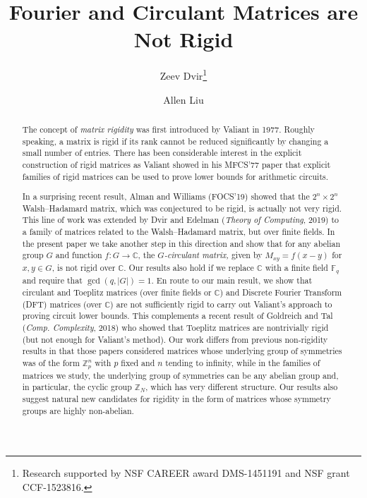 \documentclass{toc}
\newcommand\F{{\mathbb{F}}}
\renewcommand\Z{{\mathbb{Z}}}
\renewcommand\C{{\mathbb{C}}}
\begin{document}
\begin{frontmatter} %
  
%
\title{Fourier and Circulant Matrices are Not Rigid }  %

%
%

%
%
%

%
%
%
%
%
%
%
%
%
%
%
%


%
%
%
%

%

\author[dvir]{Zeev Dvir\thanks{Research supported by NSF CAREER award DMS-1451191 and NSF grant CCF-1523816.}}
\author[liu]{Allen Liu}

%
%
%
%

%
%
%
%
%
%
\begin{abstract}
The concept of \emph{matrix rigidity}
was first introduced by Valiant in 1977.
Roughly speaking, a matrix is rigid if its rank cannot be reduced 
significantly by changing a small number of entries.  There has been
considerable interest in  the explicit construction of 
rigid matrices as Valiant showed in his MFCS'77 paper that
explicit families of rigid matrices  can be used to prove
lower bounds for arithmetic circuits.

In a surprising recent result, Alman and Williams (FOCS'19)
showed that the $2^n\times 2^n$ Walsh--Hadamard matrix,  
which was conjectured to be rigid, is actually not very rigid.
This line of work was extended by 
Dvir and Edelman (\emph{Theory of Computing}, 2019) 
to a family of matrices related to the Walsh--Hadamard matrix, 
but over finite fields.  In the present paper we take another
step in this direction and show that for any abelian group $G$ and function $f: G \rightarrow \C$,
the \emph{$G$-circulant matrix,}
given by $M_{xy} = f(x - y)$ for $x,y \in G$, is not rigid over $\C$.  Our results also hold if we replace $\C$ with a finite field $\F_q$ and require that $\gcd(q,|G|) = 1$. 
En route to our main result, we show  
that circulant and Toeplitz matrices (over finite fields or $\C$) and
Discrete Fourier Transform (DFT)  matrices (over $\C$) are
%
%
not sufficiently rigid %
to carry out Valiant's approach to
proving circuit lower bounds.  
This complements a recent result of Goldreich and Tal
(\emph{Comp. Complexity}, 2018)  
who showed that Toeplitz matrices are nontrivially rigid (but not enough
for Valiant's method).  Our work differs from previous non-rigidity
results in that those papers 
considered matrices whose underlying group of symmetries was of the form 
$\Z_p^n$ with $p$ fixed and $n$ tending to infinity, while in the families
of matrices we study, the underlying group of symmetries can be any abelian group and, in particular, the cyclic group $\Z_N$, which has very different structure. Our results also suggest natural new candidates for rigidity in the form of matrices whose symmetry groups are highly non-abelian.
\end{abstract}


\end{frontmatter}
\end{document}

